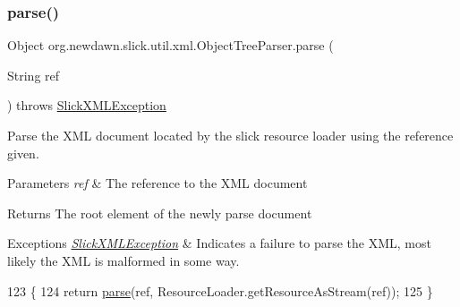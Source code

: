 \subsubsection{\texorpdfstring{parse()}{parse()}\hspace{0.1cm}{\footnotesize\ttfamily [1/2]}}
{\footnotesize\ttfamily Object org.\+newdawn.\+slick.\+util.\+xml.\+Object\+Tree\+Parser.\+parse (\begin{DoxyParamCaption}\item[{String}]{ref }\end{DoxyParamCaption}) throws \mbox{\hyperlink{classorg_1_1newdawn_1_1slick_1_1util_1_1xml_1_1_slick_x_m_l_exception}{Slick\+X\+M\+L\+Exception}}\hspace{0.3cm}{\ttfamily [inline]}}

Parse the X\+ML document located by the slick resource loader using the reference given.


\begin{DoxyParams}{Parameters}
{\em ref} & The reference to the X\+ML document \\
\hline
\end{DoxyParams}
\begin{DoxyReturn}{Returns}
The root element of the newly parse document 
\end{DoxyReturn}

\begin{DoxyExceptions}{Exceptions}
{\em \mbox{\hyperlink{classorg_1_1newdawn_1_1slick_1_1util_1_1xml_1_1_slick_x_m_l_exception}{Slick\+X\+M\+L\+Exception}}} & Indicates a failure to parse the X\+ML, most likely the X\+ML is malformed in some way. \\
\hline
\end{DoxyExceptions}

\begin{DoxyCode}
123                                                              \{
124         \textcolor{keywordflow}{return} \mbox{\hyperlink{classorg_1_1newdawn_1_1slick_1_1util_1_1xml_1_1_object_tree_parser_a0e937d050a1ad0e58e24465f87ac5eee}{parse}}(ref, ResourceLoader.getResourceAsStream(ref));
125     \}
\end{DoxyCode}
\mbox{\label{classorg_1_1newdawn_1_1slick_1_1util_1_1xml_1_1_object_tree_parser_ad4fb701b5ad924401683319443407f2e}} 

